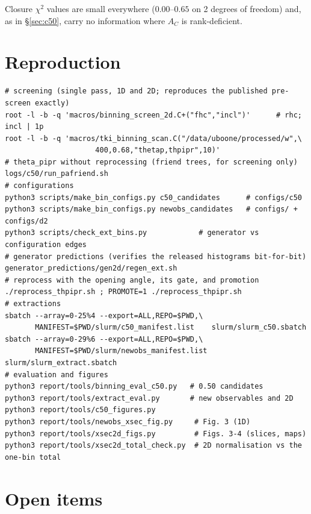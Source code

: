 Closure $\chi^2$ values are small everywhere ($0.00$--$0.65$ on 2 degrees of freedom) and, as in
\S\ref{sec:c50}, carry no information where $A_C$ is rank-deficient.

\section{Reproduction}
\label{sec:repro}

\begin{small}
\begin{verbatim}
# screening (single pass, 1D and 2D; reproduces the published pre-screen exactly)
root -l -b -q 'macros/binning_screen_2d.C+("fhc","incl")'      # rhc; incl | 1p
root -l -b -q 'macros/tki_binning_scan.C("/data/uboone/processed/w",\
                     400,0.68,"thetap,thpipr",10)'
# theta_pipr without reprocessing (friend trees, for screening only)
logs/c50/run_pafriend.sh
# configurations
python3 scripts/make_bin_configs.py c50_candidates      # configs/c50
python3 scripts/make_bin_configs.py newobs_candidates   # configs/ + configs/d2
python3 scripts/check_ext_bins.py            # generator vs configuration edges
# generator predictions (verifies the released histograms bit-for-bit)
generator_predictions/gen2d/regen_ext.sh
# reprocess with the opening angle, its gate, and promotion
./reprocess_thpipr.sh ; PROMOTE=1 ./reprocess_thpipr.sh
# extractions
sbatch --array=0-25%4 --export=ALL,REPO=$PWD,\
       MANIFEST=$PWD/slurm/c50_manifest.list    slurm/slurm_c50.sbatch
sbatch --array=0-29%6 --export=ALL,REPO=$PWD,\
       MANIFEST=$PWD/slurm/newobs_manifest.list slurm/slurm_extract.sbatch
# evaluation and figures
python3 report/tools/binning_eval_c50.py   # 0.50 candidates
python3 report/tools/extract_eval.py       # new observables and 2D
python3 report/tools/c50_figures.py
python3 report/tools/newobs_xsec_fig.py     # Fig. 3 (1D)
python3 report/tools/xsec2d_figs.py         # Figs. 3-4 (slices, maps)
python3 report/tools/xsec2d_total_check.py  # 2D normalisation vs the one-bin total
\end{verbatim}
\end{small}

\section{Open items}
\label{sec:open}


